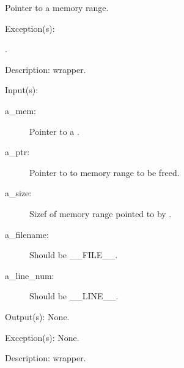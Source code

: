\begin{capi}
\begin{capilist}
\begin{description}
			Pointer to a memory range.
		\end{description}
	\item[Exception(s): ]
		\begin{description}\item[]
		\item[.]
		\end{description}
	\item[Description: ]
		 wrapper.
	\end{capilist}
\label{mem_free_e}
\label{mem_free}
\label{_cw_free}
	\begin{capilist}
	\item[Input(s): ]
		\begin{description}\item[]
		\item[a\_mem: ]
			Pointer to a .
		\item[a\_ptr: ]
			Pointer to to memory range to be freed.
		\item[a\_size: ]
			Sizef of memory range pointed to by .
		\item[a\_filename: ]
			Should be \_\_FILE\_\_.
		\item[a\_line\_num: ]
			Should be \_\_LINE\_\_.
		\end{description}
	\item[Output(s): ] None.
	\item[Exception(s): ] None.
	\item[Description: ]
		 wrapper.
	\end{capilist}
\end{capi}
